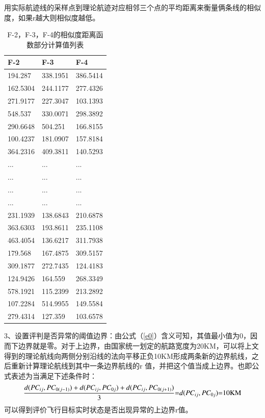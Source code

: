 \documentclass[GBK]{ctexart}
\begin{document}
\begin{spacing}{1.5}
用实际航迹线的采样点到理论航迹对应相邻三个点的平均距离来衡量俩条线的相似度，如果r越大则相似度越低。
\begin{table}[H]
  \centering
  \caption{F-2，F-3，F-4的相似度距离函数部分计算值列表}
    \begin{tabular}{lll}
    \toprule[2.5pt]
    \multicolumn{1}{l}{F-2} & \multicolumn{1}{l}{F-3} & \multicolumn{1}{l}{F-4} \\
    \midrule[1.5pt]
    194.287 & 338.1951 & 386.5414 \\
    162.5304 & 244.1177 & 277.4326 \\
    271.9177 & 227.3047 & 103.1393 \\
    548.537 & 330.0071 & 298.3892 \\
    290.6648 & 504.251 & 166.8155 \\
    100.4237 & 181.0907 & 157.8184 \\
    364.2316 & 409.3811 & 140.5293 \\
    \multicolumn{1}{l}{...} & \multicolumn{1}{l}{...} & \multicolumn{1}{l}{...} \\
    \multicolumn{1}{l}{...} & \multicolumn{1}{l}{...} & \multicolumn{1}{l}{...} \\
    \multicolumn{1}{l}{...} & \multicolumn{1}{l}{...} & \multicolumn{1}{l}{...} \\
    \multicolumn{1}{l}{...} & \multicolumn{1}{l}{...} & \multicolumn{1}{l}{...} \\
    231.1939 & 138.6843 & 210.6878 \\
    363.6303 & 193.8611 & 235.1108 \\
    463.4054 & 136.6217 & 311.7938 \\
    179.568 & 167.4875 & 309.5157 \\
    309.1877 & 272.7435 & 124.4183 \\
    124.9426 & 164.559 & 268.3349 \\
    578.1921 & 115.2399 & 213.2892 \\
    107.2284 & 514.9955 & 149.5584 \\
    279.4314 & 127.359 & 103.6578 \\
    \bottomrule[2.5pt]
    \end{tabular}%
  \label{tab:addlabel}%
\end{table}%
3、设置评判是否异常的阈值边界：由公式（\ref{e0}）含义可知，其值最小值为0，因而下边界就是零。对于上边界，由国家统一划定的航路宽度为20KM，可以将上文得到的理论航线向两侧分别沿线的法向平移正负10KM形成两条新的边界航线，之后重新计算理论航线到其中一条边界航线的r 值，并把这个值当成上边界。也即公式表述为当满足下述条件时：
\begin{equation}\label{e0}
   \frac{{d(P{C_{ij}},P{C_{0(j - 1)}}) + d(P{C_{ij}},P{C_{0j}}) + d(P{C_{ij}},P{C_{0(j + 1)}})}}{3}{\rm{ = }}d(P{C_{ij}},P{C_{0j}}){\rm{ = }}10{\rm{KM}}
\end{equation}
可以得到评价飞行目标实时状态是否出现异常的上边界r值。

\end{spacing}
\end{document}
